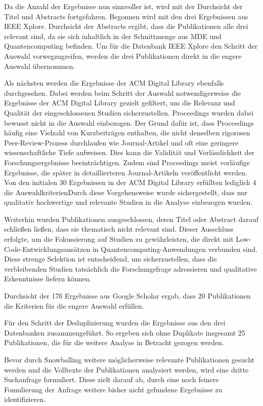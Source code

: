 Da die Anzahl der Ergebnisse nun sinnvoller ist, wird mit der Durchsicht der Titel und Abstracts fortgefahren. 
Begonnen wird mit den drei Ergebnissen aus IEEE Xplore. Durchsicht der Abstracts ergibt, dass die Publikationen 
alle drei relevant sind, da sie sich inhaltlich in der Schnittmenge aus MDE und Quantencomputing befinden. 
Um für die Datenbank IEEE Xplore den Schritt der Auswahl vorwegzugreifen, werden die drei Publikationen 
direkt in die engere Auswahl übernommen. 

Als nächsten werden die Ergebnisse der ACM Digital Library ebenfalls durchgesehen. Dabei werden beim Schritt der Auswahl notwendigerweise die 
Ergebnisse der ACM Digital Library gezielt gefiltert, um die Relevanz und Qualität der eingeschlossenen Studien sicherzustellen. 
Proceedings wurden dabei bewusst nicht in die Auswahl einbezogen. Der Grund dafür ist, dass Proceedings häufig eine 
Vielzahl von Kurzbeiträgen enthalten, die nicht denselben rigorosen Peer-Review-Prozess durchlaufen wie Journal-Artikel 
und oft eine geringere wissenschaftliche Tiefe aufweisen. Dies kann die Validität und Verlässlichkeit der 
Forschungsergebnisse beeinträchtigen. Zudem sind Proceedings meist vorläufige Ergebnisse, die 
später in detaillierteren Journal-Artikeln veröffentlicht werden. Von den initialen 30 Ergebnissen 
in der ACM Digital Library erfüllten lediglich 4 die AuswahlkriterienDurch diese Vorgehensweise wurde 
sichergestellt, dass nur qualitativ hochwertige und relevante Studien in die Analyse einbezogen wurden.

Weiterhin wurden Publikationen ausgeschlossen, deren Titel oder Abstract darauf schließen ließen, dass sie thematisch 
nicht relevant sind. Dieser Ausschluss erfolgte, um die Fokussierung auf Studien zu gewährleisten, die direkt mit 
Low-Code-Entwicklungsansätzen in Quantencomputing-Anwendungen verbunden sind. Diese strenge Selektion ist entscheidend, um 
sicherzustellen, dass die verbleibenden Studien tatsächlich die Forschungsfrage adressieren und qualitative Erkenntnisse liefern können. 

Durchsicht der 176 Ergebnisse aus Google Scholar ergab, dass 20 Publikationen die Kriterien für die engere Auswahl erfüllen. 

Für den Schritt der Deduplizierung wurden die Ergebnisse aus den drei Datenbanken zusammengeführt. 
So ergeben sich ohne Duplikate insgesamt 25 Publikationen, die für die weitere Analyse in Betracht gezogen werden. 

Bevor durch Snowballing weitere möglicherweise relevante Publikationen gesucht werden und die Volltexte der Publikationen analysiert werden, 
wird eine dritte Suchanfrage formuliert. Diese zielt darauf ab, durch eine noch feinere Fomulierung der Anfrage weitere bisher nicht gefundene 
Ergebnisse zu identifizieren. 

